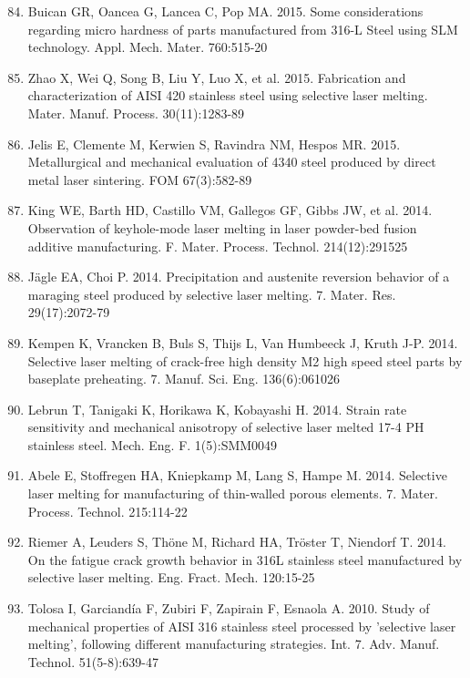 \documentclass[10pt]{article}
\begin{document}
\begin{enumerate}
  \setcounter{enumi}{83}
  \item Buican GR, Oancea G, Lancea C, Pop MA. 2015. Some considerations regarding micro hardness of parts manufactured from 316-L Steel using SLM technology. Appl. Mech. Mater. 760:515-20

  \item Zhao X, Wei Q, Song B, Liu Y, Luo X, et al. 2015. Fabrication and characterization of AISI 420 stainless steel using selective laser melting. Mater. Manuf. Process. 30(11):1283-89

  \item Jelis E, Clemente M, Kerwien S, Ravindra NM, Hespos MR. 2015. Metallurgical and mechanical evaluation of 4340 steel produced by direct metal laser sintering. FOM 67(3):582-89

  \item King WE, Barth HD, Castillo VM, Gallegos GF, Gibbs JW, et al. 2014. Observation of keyhole-mode laser melting in laser powder-bed fusion additive manufacturing. F. Mater. Process. Technol. 214(12):291525

  \item Jägle EA, Choi P. 2014. Precipitation and austenite reversion behavior of a maraging steel produced by selective laser melting. 7. Mater. Res. 29(17):2072-79

  \item Kempen K, Vrancken B, Buls S, Thijs L, Van Humbeeck J, Kruth J-P. 2014. Selective laser melting of crack-free high density M2 high speed steel parts by baseplate preheating. 7. Manuf. Sci. Eng. 136(6):061026

  \item Lebrun T, Tanigaki K, Horikawa K, Kobayashi H. 2014. Strain rate sensitivity and mechanical anisotropy of selective laser melted 17-4 PH stainless steel. Mech. Eng. F. 1(5):SMM0049

  \item Abele E, Stoffregen HA, Kniepkamp M, Lang S, Hampe M. 2014. Selective laser melting for manufacturing of thin-walled porous elements. 7. Mater. Process. Technol. 215:114-22

  \item Riemer A, Leuders S, Thöne M, Richard HA, Tröster T, Niendorf T. 2014. On the fatigue crack growth behavior in 316L stainless steel manufactured by selective laser melting. Eng. Fract. Mech. 120:15-25

  \item Tolosa I, Garciandía F, Zubiri F, Zapirain F, Esnaola A. 2010. Study of mechanical properties of AISI 316 stainless steel processed by 'selective laser melting', following different manufacturing strategies. Int. 7. Adv. Manuf. Technol. 51(5-8):639-47


\end{enumerate}
\end{document}
